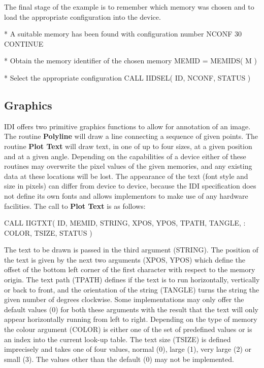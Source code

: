 \documentclass[11pt,nolof]{starlink}
\begin{document}
The final stage of the example is to remember which memory was chosen
and to load the appropriate configuration into the device.
\begin{small}
\begin{terminalv}
*   A suitable memory has been found with configuration number NCONF
  30  CONTINUE

*   Obtain the memory identifier of the chosen memory
      MEMID = MEMIDS( M )

*   Select the appropriate configuration
      CALL IIDSEL( ID, NCONF, STATUS )
\end{terminalv}
\end{small}

\subsection{Graphics}

IDI offers two primitive graphics functions to allow for annotation of an
image. The routine \textbf{Polyline} will draw a line connecting a sequence
of given points. The routine \textbf{Plot Text} will draw text, in one of
up to four sizes, at a given position and at a given angle. Depending on
the capabilities of a device either of these
routines may overwrite the pixel values of the given memories, and any
existing data at these locations will be lost.
The appearance of the text (font style and size in pixels) can differ
from device to device, because the IDI specification does not define
its own fonts and allows implementors to make use of any hardware
facilities. The call to \textbf{Plot Text} is as follows:
\begin{small}
\begin{terminalv}
      CALL IIGTXT( ID, MEMID, STRING, XPOS, YPOS, TPATH, TANGLE,
     :             COLOR, TSIZE, STATUS )
\end{terminalv}
\end{small}
The text to be drawn is passed in the third argument (STRING). The
position of the text is given by the next two arguments (XPOS, YPOS)
which define the offset of the bottom left corner of the first
character with respect to the memory origin. The text path (TPATH)
defines if the text is to run horizontally, vertically or back to front,
and the orientation of the string (TANGLE) turns the string the given
number of degrees clockwise. Some implementations may only offer the
default values (0) for both these arguments with the result that the
text will only appear horizontally running from left to right.
Depending on the type of memory the colour argument (COLOR) is either
one of the set of predefined values or is an index into the current
look-up table. The text size (TSIZE) is defined imprecisely and takes
one of four values, normal (0), large (1), very large (2) or small (3).
The values other than the default (0) may not be implemented.
\end{document}
